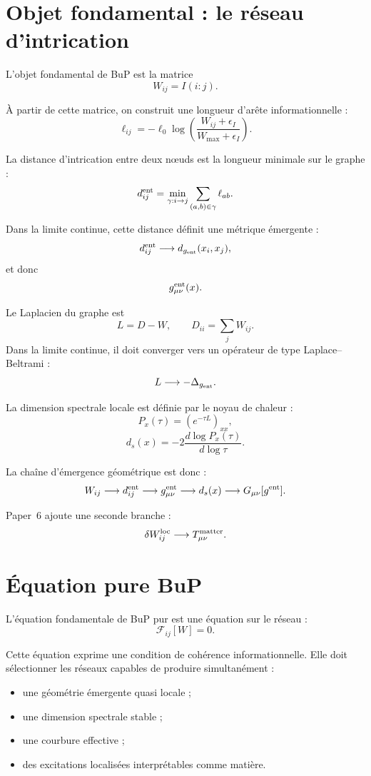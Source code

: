 \documentclass[11pt,a4paper]{article}
\begin{document}
\section{Objet fondamental : le réseau d'intrication}
\label{sec:network}

L'objet fondamental de BuP est la matrice
\[
W_{ij}=I(i:j).
\]

À partir de cette matrice, on construit une longueur d'arête informationnelle :
\[
\ell_{ij}
=
-\ell_0
\log
\left(
\frac{W_{ij}+\epsilon_I}{W_{\max}+\epsilon_I}
\right).
\]

La distance d'intrication entre deux nœuds est la longueur minimale sur le graphe :
\[
d_{ij}^{\rm ent}
=
\min_{\gamma:i\rightarrow j}
\sum_{(a,b)\in\gamma}
\ell_{ab}.
\]

Dans la limite continue, cette distance définit une métrique émergente :
\[
d_{ij}^{\rm ent}
\longrightarrow
d_{g_{\rm ent}}(x_i,x_j),
\]
et donc
\[
g_{\mu\nu}^{\rm ent}(x).
\]

Le Laplacien du graphe est
\[
L=D-W,
\qquad
D_{ii}=\sum_j W_{ij}.
\]
Dans la limite continue, il doit converger vers un opérateur de type Laplace--Beltrami :
\[
L
\longrightarrow
-\Delta_{g_{\rm ent}}.
\]

La dimension spectrale locale est définie par le noyau de chaleur :
\[
P_x(\tau)
=
\left(e^{-\tau L}\right)_{xx},
\]
\[
d_s(x)
=
-2\frac{d\log P_x(\tau)}{d\log \tau}.
\]

La chaîne d'émergence géométrique est donc :
\[
W_{ij}
\longrightarrow
d_{ij}^{\rm ent}
\longrightarrow
g_{\mu\nu}^{\rm ent}
\longrightarrow
d_s(x)
\longrightarrow
G_{\mu\nu}[g^{\rm ent}].
\]

Paper~6 ajoute une seconde branche :
\[
\delta W_{ij}^{\rm loc}
\longrightarrow
T_{\mu\nu}^{\rm matter}.
\]

\section{Équation pure BuP}
\label{sec:pure-equation}

L'équation fondamentale de BuP pur est une équation sur le réseau :
\[
\boxed{
\mathcal{F}_{ij}[W]=0.
}
\]

Cette équation exprime une condition de cohérence informationnelle. Elle doit sélectionner les réseaux capables de produire simultanément :
\begin{itemize}
  \item une géométrie émergente quasi locale ;
  \item une dimension spectrale stable ;
  \item une courbure effective ;
  \item des excitations localisées interprétables comme matière.
\end{itemize}
\end{document}
